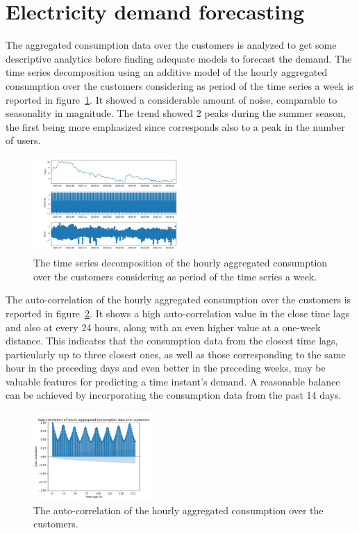 \section{Electricity demand forecasting}
\label{sec:demandval}
\vspace{0.2 cm}

The aggregated consumption data over the customers is analyzed to get some descriptive analytics before finding adequate models to forecast the demand.
The time series decomposition using an additive model of the hourly aggregated consumption over the customers considering as period of the time series a week is reported in figure~\ref{fig:demanddecomposition}.
It showed a considerable amount of noise, comparable to seasonality in magnitude.
The trend showed 2 peaks during the summer season, the first being more emphasized since corresponds also to a peak in the number of users.

\begin{figure}[H]
\centering
\includegraphics[width=0.5\textwidth]{images/demand/hourly_decomposition_week_period}
\caption{The time series decomposition of the hourly aggregated consumption over the customers considering as period of the time series a week.}
\label{fig:demanddecomposition}
\end{figure}

The auto-correlation of the hourly aggregated consumption over the customers is reported in figure~\ref{fig:demandcorrelation}.
It shows a high auto-correlation value in the close time lags and also at every 24 hours, along with an even higher value at a one-week distance.
This indicates that the consumption data from the closest time lags, particularly up to three closest ones, as well as those corresponding to the same hour in the preceding days and even better in the preceding weeks, may be valuable features for predicting a time instant's demand.
A reasonable balance can be achieved by incorporating the consumption data from the past 14 days.

\begin{figure}[H]
\centering
\includegraphics[width=0.4\textwidth]{images/demand/hourly_correlation_week_range}
\caption{The auto-correlation of the hourly aggregated consumption over the customers.}
\label{fig:demandcorrelation}
\end{figure}

